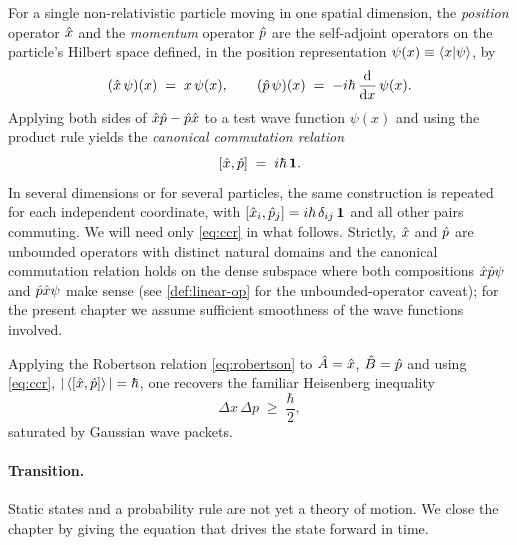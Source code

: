 \begin{definition}
\label{def:position-momentum}
For a single non-relativistic particle moving in one spatial
dimension, the \emph{position} operator $\hat{x}$ and the
\emph{momentum} operator $\hat{p}$ are the self-adjoint operators on
the particle's Hilbert space defined, in the position
representation $\psi(x)\equiv\braket{x}{\psi}$, by
\begin{equation}
(\hat{x}\,\psi)(x) \;=\; x\,\psi(x),
\qquad
(\hat{p}\,\psi)(x) \;=\; -i\hbar\,\dv{x}\,\psi(x).
\end{equation}
Applying both sides of $\hat{x}\hat{p}-\hat{p}\hat{x}$ to a test wave
function $\psi(x)$ and using the product rule yields the
\emph{canonical commutation relation}
\begin{equation}
\label{eq:ccr}
[\hat{x},\hat{p}] \;=\; i\hbar\,\mathbf{1}.
\end{equation}
In several dimensions or for several particles, the same
construction is repeated for each independent coordinate, with
$[\hat{x}_i,\hat{p}_j]=i\hbar\,\delta_{ij}\,\mathbf{1}$ and all other pairs
commuting. We will need only \cref{eq:ccr} in what follows.
Strictly, $\hat{x}$ and $\hat{p}$ are unbounded operators with
distinct natural domains and the canonical commutation relation
holds on the dense subspace where both compositions
$\hat{x}\hat{p}\psi$ and $\hat{p}\hat{x}\psi$ make sense (see
\cref{def:linear-op} for the unbounded-operator caveat); for the
present chapter we assume sufficient smoothness of the wave
functions involved.
\end{definition}

\begin{example}
Applying the Robertson relation \cref{eq:robertson} to
$\hat{A}=\hat{x}$, $\hat{B}=\hat{p}$ and using \cref{eq:ccr},
$|\expval{[\hat{x},\hat{p}]}|=\hbar$, one recovers the familiar
Heisenberg inequality~\cite{heisenberg1927}
\begin{equation}
\Delta x\,\Delta p \;\geq\; \frac{\hbar}{2},
\end{equation}
saturated by Gaussian wave packets.
\end{example}

\paragraph{Transition.}
Static states and a probability rule are not yet a theory of motion.
We close the chapter by giving the equation that drives the state
forward in time.

